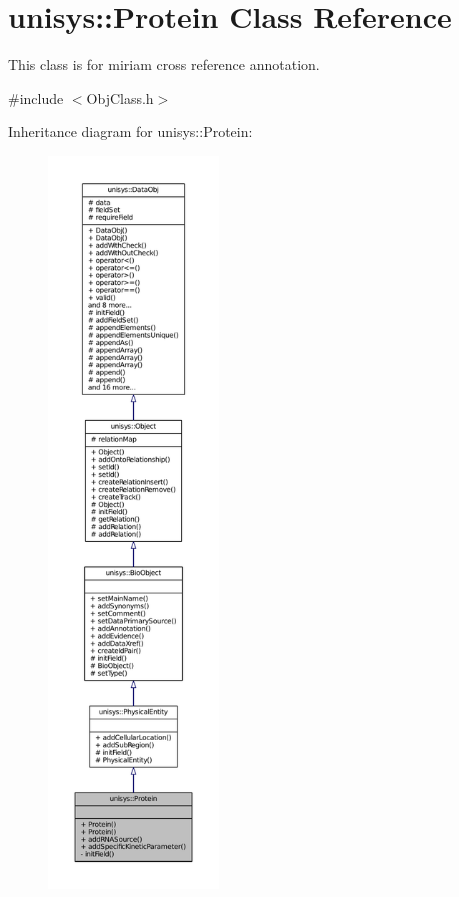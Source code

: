 \hypertarget{classunisys_1_1Protein}{\section{unisys\-:\-:Protein Class Reference}
\label{classunisys_1_1Protein}
}


This class is for miriam cross reference annotation.  




{\ttfamily \#include $<$Obj\-Class.\-h$>$}



Inheritance diagram for unisys\-:\-:Protein\-:
\nopagebreak
\begin{figure}[H]
\begin{center}
\leavevmode
\includegraphics[height=550pt]{classunisys_1_1Protein__inherit__graph}
\end{center}
\end{figure}


